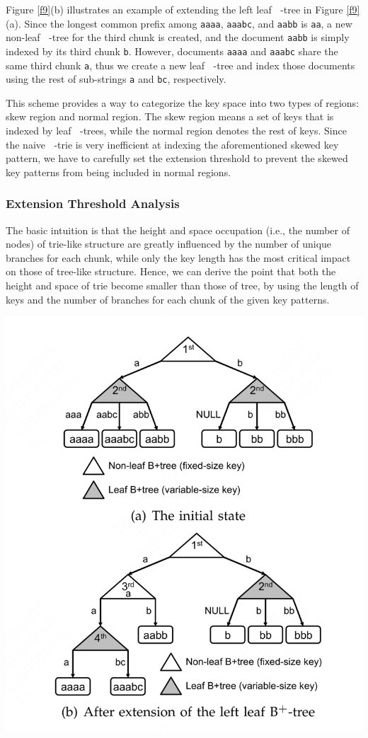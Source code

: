 \documentclass[11pt]{article}
\DeclareMathOperator{\HBP}{\text{HB}^+}
\DeclareMathOperator{\BP}{\text{B}^+}
\begin{document}
Figure \ref{f9}(b) illustrates an example of extending the left leaf \(\BP\)-tree in Figure \ref{f9}(a).
Since the longest common prefix among \texttt{aaaa}, \texttt{aaabc}, and \texttt{aabb} is \texttt{aa}, a new non-leaf \(\BP\)-tree for the
third chunk is created, and the document \texttt{aabb} is simply indexed by its third chunk \texttt{b}. However,
documents \texttt{aaaa} and \texttt{aaabc} share the same third chunk \texttt{a}, thus we create a new leaf \(\BP\)-tree and
index those documents using the rest of sub-strings \texttt{a} and \texttt{bc}, respectively.

This scheme provides a way to categorize the key space into two types of regions: skew region and
normal region. The skew region means a set of keys that is indexed by leaf \(\BP\)-trees, while the
normal region denotes the rest of keys. Since the naive \(\HBP\)-trie is very inefficient at indexing
the aforementioned skewed key pattern, we have to carefully set the extension threshold to prevent the
skewed key patterns from being included in normal regions.
\subsubsection{Extension Threshold Analysis}
\label{sec:orgb32c434}
The basic intuition is that the height and space occupation (i.e., the number of nodes) of trie-like
structure are greatly influenced by the number of unique branches for each chunk, while only the key
length has the most critical impact on those of tree-like structure. Hence, we can derive the point
that both the height and space of trie become smaller than those of tree, by using the length of keys
and the number of branches for each chunk of the given key patterns.

\begin{center}
\includegraphics[width=.7\textwidth]{../../images/papers/151.png}
\end{center}
\end{document}
